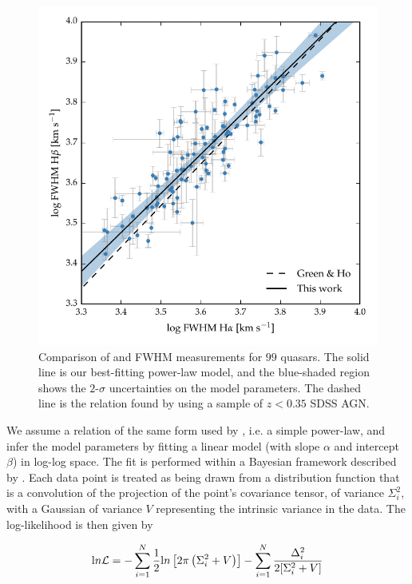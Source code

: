 \begin{figure}[h!]
    \centering 
    \includegraphics[width=0.8\columnwidth]{figures/chapter03/ha_hb_width_comparison.pdf} 
    \caption[{Comparison of \ha and \hb FWHM measurements for $99$ quasars.}]{Comparison of \ha and \hb FWHM measurements for $99$ quasars. The solid line is our best-fitting power-law model, and the blue-shaded region shows the $2$-$\sigma$ uncertainties on the model parameters. The dashed line is the relation found by \citet{greene05b} using a sample of $z<0.35$ SDSS AGN.} 
    \label{fig:hahbcomp}
\end{figure}

We assume a relation of the same form used by \citet{greene05b}, i.e. a simple power-law, and infer the model parameters by fitting a linear model (with slope $\alpha$ and intercept $\beta$) in log-log space.
The fit is performed within a Bayesian framework described by \citet{hogg10}. 
Each data point is treated as being drawn from a distribution function that is a convolution of the projection of the point's covariance tensor, of variance $\Sigma_i^2$, with a Gaussian of variance $V$ representing the intrinsic variance in the data.
The log-likelihood is then given by 

\begin{eqnarray}
  {\mathrm ln} {\cal L} = - \sum_{i=1}^N \frac{1}{2} {\mathrm ln}\left[2\pi\left(\Sigma_i^2 + V\right)\right] - \sum_{i=1}^N \frac{\Delta_i^2}{2[\Sigma_i^2 + V]} 
\end{eqnarray}

